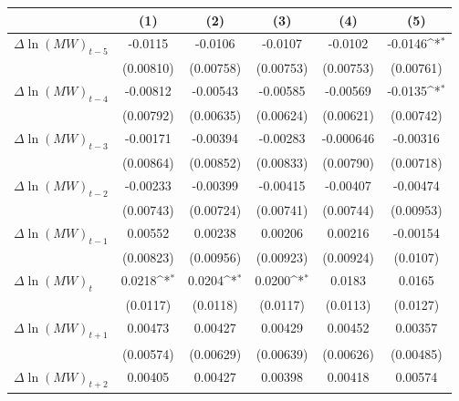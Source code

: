 {
\def\sym#1{\ifmmode^{#1}\else\(^{#1}\)\fi}
\begin{tabular}{l*{5}{c}}
\hline\hline
          &\multicolumn{1}{c}{(1)}         &\multicolumn{1}{c}{(2)}         &\multicolumn{1}{c}{(3)}         &\multicolumn{1}{c}{(4)}         &\multicolumn{1}{c}{(5)}         \\
\hline
$\Delta \ln(MW)_{t-5}$&  -0.0115         &  -0.0106         &  -0.0107         &  -0.0102         &  -0.0146\sym{*}  \\
          &(0.00810)         &(0.00758)         &(0.00753)         &(0.00753)         &(0.00761)         \\
[1em]
$\Delta \ln(MW)_{t-4}$& -0.00812         & -0.00543         & -0.00585         & -0.00569         &  -0.0135\sym{*}  \\
          &(0.00792)         &(0.00635)         &(0.00624)         &(0.00621)         &(0.00742)         \\
[1em]
$\Delta \ln(MW)_{t-3}$& -0.00171         & -0.00394         & -0.00283         &-0.000646         & -0.00316         \\
          &(0.00864)         &(0.00852)         &(0.00833)         &(0.00790)         &(0.00718)         \\
[1em]
$\Delta \ln(MW)_{t-2}$& -0.00233         & -0.00399         & -0.00415         & -0.00407         & -0.00474         \\
          &(0.00743)         &(0.00724)         &(0.00741)         &(0.00744)         &(0.00953)         \\
[1em]
$\Delta \ln(MW)_{t-1}$&  0.00552         &  0.00238         &  0.00206         &  0.00216         & -0.00154         \\
          &(0.00823)         &(0.00956)         &(0.00923)         &(0.00924)         & (0.0107)         \\
[1em]
$\Delta \ln(MW)_{t}$&   0.0218\sym{*}  &   0.0204\sym{*}  &   0.0200\sym{*}  &   0.0183         &   0.0165         \\
          & (0.0117)         & (0.0118)         & (0.0117)         & (0.0113)         & (0.0127)         \\
[1em]
$\Delta \ln(MW)_{t+1}$&  0.00473         &  0.00427         &  0.00429         &  0.00452         &  0.00357         \\
          &(0.00574)         &(0.00629)         &(0.00639)         &(0.00626)         &(0.00485)         \\
[1em]
$\Delta \ln(MW)_{t+2}$&  0.00405         &  0.00427         &  0.00398         &  0.00418         &  0.00574         \\

\end{tabular}}
